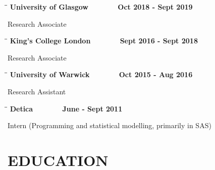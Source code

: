 \documentclass{res}
\begin{document}
\begin{resume}
\vspace{-0.1in}	
   \begin{tabbing}
   \hspace{2in}\= \hspace{2in}\= \kill %
    {\bf University of Glasgow}\>~\> ~~~~~~ {\bf Oct 2018 - Sept 2019}\\
   \end{tabbing}\vspace{-20pt}      %
      Research Associate   

\vspace{-0.1in}	
   \begin{tabbing}
   \hspace{2in}\= \hspace{2in}\= \kill %
    {\bf King's College London}\>~\> ~~~~~~ {\bf Sept 2016 - Sept 2018}\\
   \end{tabbing}\vspace{-20pt}      %
      Research Associate   
   
\vspace{-0.1in}	
   \begin{tabbing}
   \hspace{2in}\= \hspace{2in}\= \kill %
    {\bf University of Warwick}\>~\> ~~~~~~ {\bf Oct 2015 - Aug 2016}\\
   \end{tabbing}\vspace{-20pt}      %
      Research Assistant    
      
\vspace{-0.1in}	
   \begin{tabbing}
   \hspace{2in}\= \hspace{2in}\= \kill %
    {\bf Detica}\>~\> ~~~~~~ {\bf June - Sept 2011}\\
   \end{tabbing}\vspace{-20pt}      %
      Intern (Programming and statistical modelling, primarily in SAS)    
      
\section{EDUCATION}          
        

\end{resume}
\end{document}
